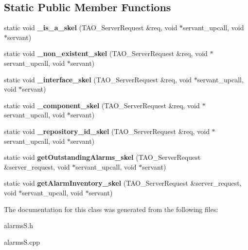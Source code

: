 \subsection*{Static Public Member Functions}
\begin{DoxyCompactItemize}
\item 
static void {\bfseries \+\_\+is\+\_\+a\+\_\+skel} (T\+A\+O\+\_\+\+Server\+Request \&req, void $\ast$servant\+\_\+upcall, void $\ast$servant)\label{classPOA__alarms_1_1alarmInterface_aacd4ea956c0abf70473e5d3a76e93788}

\item 
static void {\bfseries \+\_\+non\+\_\+existent\+\_\+skel} (T\+A\+O\+\_\+\+Server\+Request \&req, void $\ast$servant\+\_\+upcall, void $\ast$servant)\label{classPOA__alarms_1_1alarmInterface_ad3123e5a8bf16eabeb30685c1944c26c}

\item 
static void {\bfseries \+\_\+interface\+\_\+skel} (T\+A\+O\+\_\+\+Server\+Request \&req, void $\ast$servant\+\_\+upcall, void $\ast$servant)\label{classPOA__alarms_1_1alarmInterface_ad5362a63bc61c721f626a3da02de23d8}

\item 
static void {\bfseries \+\_\+component\+\_\+skel} (T\+A\+O\+\_\+\+Server\+Request \&req, void $\ast$servant\+\_\+upcall, void $\ast$servant)\label{classPOA__alarms_1_1alarmInterface_a8892e244f3ef72ead6c038f82ae5f79d}

\item 
static void {\bfseries \+\_\+repository\+\_\+id\+\_\+skel} (T\+A\+O\+\_\+\+Server\+Request \&req, void $\ast$servant\+\_\+upcall, void $\ast$servant)\label{classPOA__alarms_1_1alarmInterface_adbadea5bda03e03bc68c97eb4e4c2ad7}

\item 
static void {\bfseries get\+Outstanding\+Alarms\+\_\+skel} (T\+A\+O\+\_\+\+Server\+Request \&server\+\_\+request, void $\ast$servant\+\_\+upcall, void $\ast$servant)\label{classPOA__alarms_1_1alarmInterface_a90beeb7bdfa84c70ceca46198ae23f19}

\item 
static void {\bfseries get\+Alarm\+Inventory\+\_\+skel} (T\+A\+O\+\_\+\+Server\+Request \&server\+\_\+request, void $\ast$servant\+\_\+upcall, void $\ast$servant)\label{classPOA__alarms_1_1alarmInterface_aba24947d1172829395ada1b9131c823a}

\end{DoxyCompactItemize}


The documentation for this class was generated from the following files\+:\begin{DoxyCompactItemize}
\item 
alarms\+S.\+h\item 
alarms\+S.\+cpp\end{DoxyCompactItemize}
